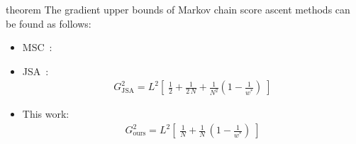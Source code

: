 

\begin{theoremEnd}{theorem}
  The gradient upper bounds of Markov chain score ascent methods can be found as follows:
  \begin{itemize}
    \item MSC~\citep{NEURIPS2020_b2070693}:
    \item JSA~\citep{pmlr-v124-ou20a}:
    \begin{align}
      G_{\text{JSA}}^2 = 
      L^2 \left[\;
      \frac{1}{2} 
      +
      \frac{1}{2 \, N} 
      +
      \frac{1}{N^2} 
      {\left(1 - \frac{1}{w^*}\right)}
      \;\right]
    \end{align}
    \item This work:
      \begin{align}
        G^2_{\text{ours}} = L^2 \left[\; \frac{1}{N} + \frac{1}{N}\,\left(1 - \frac{1}{w^*}\right) \;\right]
      \end{align}
  \end{itemize}
\end{theoremEnd}

